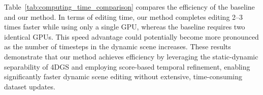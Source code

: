 Table~\ref{tab:computing_time_comparison} compares the efficiency of the baseline and our method. In terms of editing time, our method completes editing 2--3 times faster while using only a single GPU, whereas the baseline requires two identical GPUs. This speed advantage could potentially become more pronounced as the number of timesteps in the dynamic scene increases. These results demonstrate that our method achieves efficiency by leveraging the static-dynamic separability of 4DGS and employing score-based temporal refinement, enabling significantly faster dynamic scene editing without extensive, time-consuming dataset updates.


\begin{table}[!t]
\centering
\footnotesize
{}
\vspace{-2mm}
\caption{\textbf{Quantitative comparison of editing quality}: Comparison of performance metrics between Instruct 4D-to-4D (I4D24D) and our Instruct-4DGS (Ours) under various editing instructions on DyNeRF. Higher values indicate better performance for PSNR, SSIM, and CLIP similarity; lower values are better for $\text{LPIPS}_{\text{VGG}}$.}
\label{tab:comparison_metrics}
\end{table}


